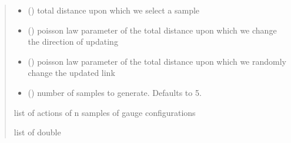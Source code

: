 \documentclass[letterpaper,10pt,english]{sphinxmanual}
\begin{document}
\begin{fulllineitems}
\begin{quote}
\begin{description}
\begin{itemize}
\item {} 
\sphinxAtStartPar
{} () \textendash{} total distance upon which we select a sample

\item {} 
\sphinxAtStartPar
{} () \textendash{} poisson law parameter of the total distance upon which we change the direction of updating

\item {} 
\sphinxAtStartPar
{} () \textendash{} poisson law parameter of the total distance upon which we randomly change the updated link

\item {} 
\sphinxAtStartPar
{} (\sphinxstyleliteralemphasis{\sphinxupquote{, }}) \textendash{} number of samples to generate. Defaults to 5.

\end{itemize}

\sphinxAtStartPar
list of actions of n samples of gauge configurations

\sphinxAtStartPar
list of double

\end{description}\end{quote}

\end{fulllineitems}



\renewcommand{\indexname}{Python Module Index}
\begin{sphinxtheindex}
\let\bigletter\sphinxstyleindexlettergroup
\bigletter{a}
\item\relax{}
\indexspace
\bigletter{e}
\item\relax{}
\indexspace
\bigletter{g}
\item\relax{}
\indexspace
\bigletter{n}
\item\relax{}
\end{sphinxtheindex}

\renewcommand{\indexname}{Index}
\printindex
\end{document}
